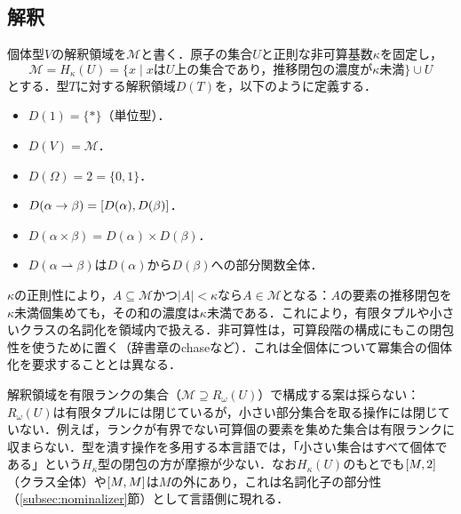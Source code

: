 \documentclass[../../main-detail.tex]{subfiles}
\begin{document}
\subsection{解釈}
\begin{definition}[解釈領域]
    個体型$V$の解釈領域を$\mathcal{M}$と書く．原子の集合$U$と正則な非可算基数$\kappa$を固定し，
\[
    \mathcal{M} = H_\kappa(U) = \{x \mid \text{$x$は$U$上の集合であり，推移閉包の濃度が$\kappa$未満}\} \cup U
\]
とする．型$T$に対する解釈領域$D(T)$を，以下のように定義する．
\begin{itemize}
    \item $D(1)=\{*\}$（単位型）．
    \item $D(V) = \mathcal{M}$．
    \item $D(\Omega) = 2 = \{0, 1\}$．
    \item $D(\alpha \to \beta) = [D(\alpha), D(\beta)]$．
    \item $D(\alpha \times \beta) = D(\alpha) \times D(\beta)$．
    \item $D(\alpha\rightharpoonup\beta)$は$D(\alpha)$から$D(\beta)$への部分関数全体．
\end{itemize}
\end{definition}
\begin{remark}[解釈領域に求める閉包性]
    $\kappa$の正則性により，$A\subseteq\mathcal{M}$かつ$|A|<\kappa$なら$A\in\mathcal{M}$となる：$A$の要素の推移閉包を$\kappa$未満個集めても，その和の濃度は$\kappa$未満である．これにより，有限タプルや小さいクラスの名詞化を領域内で扱える．非可算性は，可算段階の構成にもこの閉包性を使うために置く（辞書章のchaseなど）．これは全個体について冪集合の個体化を要求することとは異なる．
\end{remark}
\begin{whynot}
    解釈領域を有限ランクの集合（$\mathcal{M} \supseteq R_\omega(U)$）で構成する案は採らない：$R_\omega(U)$は有限タプルには閉じているが，小さい部分集合を取る操作には閉じていない．例えば，ランクが有界でない可算個の要素を集めた集合は有限ランクに収まらない．型を潰す操作を多用する本言語では，「小さい集合はすべて個体である」という$H_\kappa$型の閉包の方が摩擦が少ない．なお$H_\kappa(U)$のもとでも$[M,2]$（クラス全体）や$[M,M]$は$M$の外にあり，これは名詞化子の部分性（\ref{subsec:nominalizer}節）として言語側に現れる．
\end{whynot}
\end{document}
